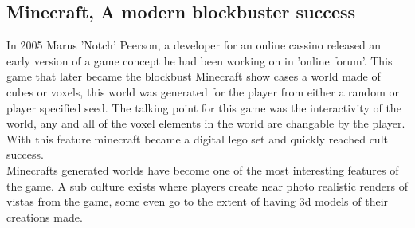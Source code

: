 \subsection{Minecraft, A modern blockbuster success}
In 2005 Marus 'Notch' Peerson, a developer for an online cassino released an
early version of a game concept he had been working on in 'online forum'. This
game that later became the blockbust Minecraft show cases a world made of cubes 
or voxels, this world was generated for the player from either a random or 
player specified seed. The talking point for this game was the interactivity of
the world, any and all of the voxel elements in the world are changable by the
player. With this feature minecraft became a digital lego set and quickly 
reached cult success.\\


Minecrafts generated worlds have become one of the most interesting features of 
the game. A sub culture exists where players create near photo realistic renders
of vistas from the game, some even go to the extent of having 3d models of their
creations made. 



 
